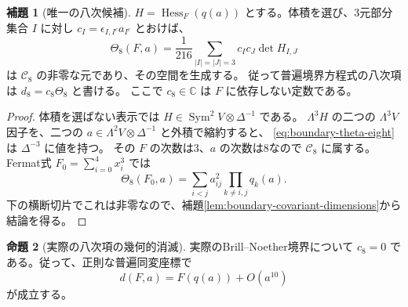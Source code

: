 \documentclass[a4paper,11pt]{ltjsarticle}
\theoremstyle{definition}
\newtheorem{theorem}{命題}[section]
\newtheorem{lemma}[theorem]{補題}
\newcommand{\CC}{\mathbb C}
\newcommand{\Sym}{\operatorname{Sym}}
\begin{document}
\begin{lemma}[唯一の八次候補]\label{lem:boundary-eighth-covariant}
$H=\operatorname{Hess}_F(q(a))$ とする。体積を選び、3元部分集合 $I$ に対し
$c_I=\epsilon_{I,I^c}a_{I^c}$ とおけば、
\begin{equation}\label{eq:boundary-theta-eight}
 \Theta_8(F,a)=\frac1{216}
       \sum_{|I|=|J|=3}c_Ic_J\det H_{I,J}
\end{equation}
は $\mathcal C_8$ の非零な元であり、その空間を生成する。
従って普遍境界方程式の八次項は $d_8=c_8\Theta_8$ と書ける。
ここで $c_8\in\CC$ は $F$ に依存しない定数である。
\end{lemma}

\begin{proof}
体積を選ばない表示では
$H\in\Sym^2V\otimes\Delta^{-1}$ である。
$\Lambda^3H$ の二つの $\Lambda^3V$ 因子を、二つの
$a\in\Lambda^2V\otimes\Delta^{-1}$ と外積で縮約すると、
\eqref{eq:boundary-theta-eight}は $\Delta^{-3}$ に値を持つ。
その $F$ の次数は3、$a$ の次数は8なので $\mathcal C_8$ に属する。
Fermat式 $F_0=\sum_{i=0}^4x_i^3$ では
\begin{equation}\label{eq:boundary-theta-fermat}
 \Theta_8(F_0,a)=
       \sum_{i<j}a_{ij}^2\prod_{k\ne i,j}q_k(a).
\end{equation}
下の横断切片でこれは非零なので、補題\ref{lem:boundary-covariant-dimensions}から結論を得る。
\end{proof}

\begin{theorem}[実際の八次項の幾何的消滅]\label{thm:boundary-eighth-vanishing}
実際のBrill--Noether境界について $c_8=0$ である。従って、正則な普遍同変座標で
\begin{equation}\label{eq:boundary-nine-jet}
                         d(F,a)=F(q(a))+O(a^{10})
\end{equation}
が成立する。
\end{theorem}
\end{document}
